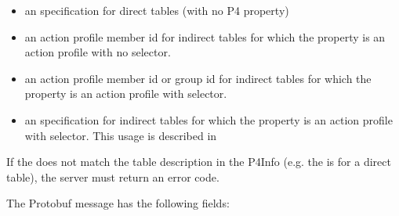 \documentclass[11pt]{article}
\begin{document}
{%
\begin{itemize}%

\item{}
an  specification for direct tables (with no P4 
property)%

\item{}
an action profile member id for indirect tables for which the 
property is an action profile with no selector.%

\item{}
an action profile member id or group id for indirect tables for which the
 property is an action profile with selector.%

\item{}
an  specification for indirect tables for
which the  property is an action profile with
selector. This usage is described in~%
\end{itemize}%

\noindent{}If the  does not match the table description in the P4Info (e.g. the
 is  for a direct table), the server must
return an  error code.%

The  Protobuf message has the following fields:%

}
\end{document}
